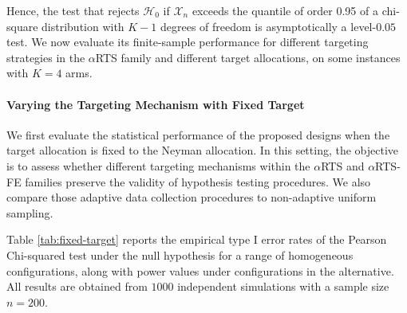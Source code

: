 {Hence, the test that rejects $\mathcal{H}_0$ if $\mathcal{X}_n$ exceeds the quantile of order 0.95 of a chi-square distribution with $K-1$ degrees of freedom is asymptotically a level-$0.05$ test.} We now evaluate its finite-sample performance for different targeting strategies in the $\alpha$RTS family and different target allocations, on some instances with $K=4$ arms.


\paragraph*{Varying the Targeting Mechanism with Fixed Target}
We first evaluate the statistical performance of the proposed designs when the target allocation is fixed to the Neyman allocation. In this setting, the objective is to assess whether different targeting mechanisms within the $\alpha$RTS and $\alpha$RTS-FE families preserve the validity of hypothesis testing procedures. We also compare those adaptive data collection procedures to non-adaptive uniform sampling. 

Table \ref{tab:fixed-target} reports the empirical type I error rates of the Pearson Chi-squared test under the null hypothesis for a range of homogeneous configurations, along with power values under configurations in the alternative. All results are obtained from $1000$ independent simulations with a sample size $n=200$.

%

